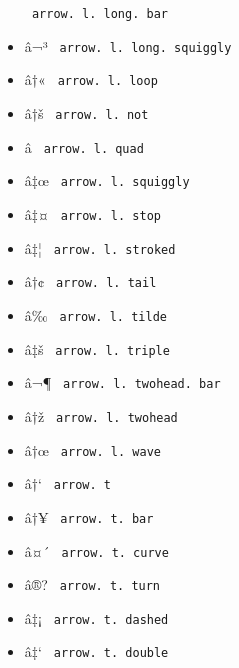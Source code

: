 \begin{itemize}
{  \texttt{\ arrow.\ l.\ long.\ bar\ }}
\item
  \label{symbol-arrow.l.long.squiggly}{{ â¬³ }
  \texttt{\ arrow.\ l.\ long.\ squiggly\ }}
\item
  \label{symbol-arrow.l.loop}{{ â†« }
  \texttt{\ arrow.\ l.\ loop\ }}
\item
  \label{symbol-arrow.l.not}{{ â†š }
  \texttt{\ arrow.\ l.\ not\ }}
\item
  \label{symbol-arrow.l.quad}{{ â­ }
  \texttt{\ arrow.\ l.\ quad\ }}
\item
  \label{symbol-arrow.l.squiggly}{{ â‡œ }
  \texttt{\ arrow.\ l.\ squiggly\ }}
\item
  \label{symbol-arrow.l.stop}{{ â‡¤ }
  \texttt{\ arrow.\ l.\ stop\ }}
\item
  \label{symbol-arrow.l.stroked}{{ â‡¦ }
  \texttt{\ arrow.\ l.\ stroked\ }}
\item
  \label{symbol-arrow.l.tail}{{ â†¢ }
  \texttt{\ arrow.\ l.\ tail\ }}
\item
  \label{symbol-arrow.l.tilde}{{ â­‰ }
  \texttt{\ arrow.\ l.\ tilde\ }}
\item
  \label{symbol-arrow.l.triple}{{ â‡š }
  \texttt{\ arrow.\ l.\ triple\ }}
\item
  \label{symbol-arrow.l.twohead.bar}{{ â¬¶ }
  \texttt{\ arrow.\ l.\ twohead.\ bar\ }}
\item
  \label{symbol-arrow.l.twohead}{{ â†ž }
  \texttt{\ arrow.\ l.\ twohead\ }}
\item
  \label{symbol-arrow.l.wave}{{ â†œ }
  \texttt{\ arrow.\ l.\ wave\ }}
\item
  \label{symbol-arrow.t}{{ â†` } \texttt{\ arrow.\ t\ }}
\item
  \label{symbol-arrow.t.bar}{{ â†¥ }
  \texttt{\ arrow.\ t.\ bar\ }}
\item
  \label{symbol-arrow.t.curve}{{ â¤´ }
  \texttt{\ arrow.\ t.\ curve\ }}
\item
  \label{symbol-arrow.t.turn}{{ â®? }
  \texttt{\ arrow.\ t.\ turn\ }}
\item
  \label{symbol-arrow.t.dashed}{{ â‡¡ }
  \texttt{\ arrow.\ t.\ dashed\ }}
\item
  \label{symbol-arrow.t.double}{{ â‡` }
  \texttt{\ arrow.\ t.\ double\ }}

\end{itemize}
